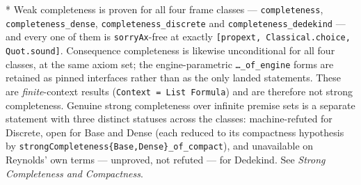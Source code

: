 \documentclass[../BimodalReference.tex]{subfiles}
\begin{document}
\noindent
* Weak completeness is proven for all four frame classes ---
\texttt{completeness}, \texttt{completeness\_dense}, \texttt{completeness\_discrete} and
\texttt{completeness\_dedekind} --- and every one of them is \texttt{sorryAx}-free at exactly
\texttt{[propext, Classical.choice, Quot.sound]}.
Consequence completeness is likewise unconditional for all four classes, at the same axiom set;
the engine-parametric \texttt{\ldots\_of\_engine} forms are retained as pinned interfaces rather
than as the only landed statements.
These are \emph{finite}-context results (\texttt{Context = List Formula}) and are therefore not
strong completeness.
Genuine strong completeness over infinite premise sets is a separate statement with three
distinct statuses across the classes: machine-refuted for Discrete, open for Base and Dense
(each reduced to its compactness hypothesis by
\texttt{strongCompleteness\{Base,Dense\}\_of\_compact}), and unavailable on Reynolds' own terms
--- unproved, not refuted --- for Dedekind.
See \emph{Strong Completeness and Compactness}.
\end{document}
